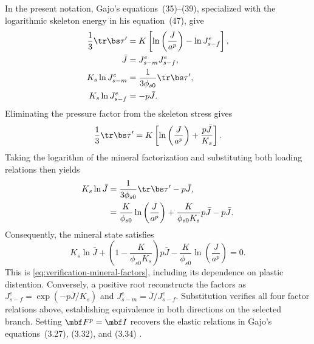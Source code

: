 In the present notation, Gajo's equations~(35)--(39), specialized with the
logarithmic skeleton energy in his equation~(47), give \citep{gajo2011}
\begin{align*}
 \frac13\tr\bs\tau^{\prime}
 &=K\left[\ln\left(\frac{J}{a^p}\right)-\ln J^e_{s-f}\right],
\\
 \bar J&=J^e_{s-m}J^e_{s-f},
\\
 K_s\ln J^e_{s-m}&=\frac{1}{3\phi_{s0}}\tr\bs\tau^{\prime},
\\
 K_s\ln J^e_{s-f}&=-p\bar J.
\end{align*}
Eliminating the pressure factor from the skeleton stress gives
\begin{equation*}
 \frac13\tr\bs\tau^{\prime}
 =K\left[\ln\left(\frac{J}{a^p}\right)+\frac{p\bar J}{K_s}\right].
\end{equation*}
Taking the logarithm of the mineral factorization and substituting both
loading relations then yields
\begin{align*}
 K_s\ln\bar J
 &=\frac{1}{3\phi_{s0}}\tr\bs\tau^{\prime}-p\bar J,
\\
 &=\frac{K}{\phi_{s0}}\ln\left(\frac{J}{a^p}\right)
 +\frac{K}{\phi_{s0}K_s}p\bar J-p\bar J.
\end{align*}
Consequently, the mineral state satisfies
\begin{equation}
 K_s\ln\bar J
 +\left(1-\frac{K}{\phi_{s0}K_s}\right)p\bar J
 -\frac{K}{\phi_{s0}}\ln\left(\frac{J}{a^p}\right)=0.
 \label{eq:gajo-plastic-scalar-mineral-closure}
\end{equation}
This is \eqref{eq:verification-mineral-factors}, including its dependence
on plastic distention.  Conversely, a positive root reconstructs the factors as
\(J^e_{s-f}=\exp(-p\bar J/K_s)\) and
\(J^e_{s-m}=\bar J/J^e_{s-f}\).  Substitution verifies all four factor
relations above, establishing equivalence in both directions on the
selected branch.  Setting \(\mbf F^p=\mbf I\) recovers the elastic
relations in Gajo's equations~(3.27), (3.32), and (3.34) \citep{gajo2010}.

